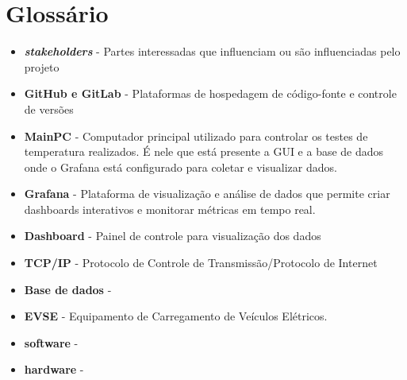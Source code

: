 \section{Glossário}


\begin{itemize}
    \item \textbf{\textit{stakeholders}} - Partes interessadas que influenciam ou são influenciadas pelo projeto
    \item \textbf{GitHub e GitLab} - Plataformas de hospedagem de código-fonte e controle de versões
    \item \textbf{MainPC} - Computador principal utilizado para controlar os testes de temperatura realizados. É nele que está presente a GUI e a base de dados onde o Grafana está configurado para coletar e visualizar dados.
    \item \textbf{Grafana} - Plataforma de visualização e análise de dados que permite criar dashboards interativos e monitorar métricas em tempo real.
    \item \textbf{Dashboard} - Painel de controle para visualização dos dados
    \item \textbf{TCP/IP} - Protocolo de Controle de Transmissão/Protocolo de Internet
    \item \textbf{Base de dados} - 
    \item \textbf{EVSE} - Equipamento de Carregamento de Veículos Elétricos.
    \item \textbf{software} -
    \item \textbf{hardware} -
\end{itemize}